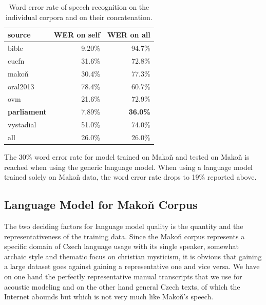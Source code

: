 \documentclass[hidelinks,12pt,a4paper]{report}
\begin{document}
\begin{table}[htpb]
\caption{Word error rate of speech recognition on the individual corpora and on
their concatenation.}
\centering
\begin{tabular}{|l||r|r|}
\hline
source    & WER on self & WER on all \\
\hline
bible     & 9.20\%  & 94.7\% \\
cucfn     & 31.6\%  & 72.8\% \\
makoň     & 30.4\%  & 77.3\% \\
oral2013  & 78.4\%  & 60.7\% \\
ovm       & 21.6\%  & 72.9\% \\
\textbf{parliament}
          & 7.89\%  & \textbf{36.0\%} \\
vystadial & 51.0\%  & 74.0\% \\
\hline
all       & 26.0\% & 26.0\% \\
\hline
\end{tabular}
\label{tab:csasr:results}
\end{table}

The 30\% word error rate for model trained on Makoň and tested on Makoň is reached when using the
generic language model. When using a language model trained solely on Makoň
data, the word error rate drops to 19\% reported above.

\subsection{Language Model for Makoň Corpus}

The two deciding factors for language model quality is the quantity and the
representativeness of the training data.
Since the Makoň corpus represents a specific domain of Czech language usage with
its single speaker, somewhat archaic style and thematic focus on christian
mysticism, it is obvious that gaining a large dataset goes against gaining a
representative one and vice versa. We have on one hand the perfectly
representative manual transcripts that we use for acoustic modeling and
on the other hand general Czech texts, of which the Internet abounds but which
is not very much like Makoň's speech.
\end{document}
